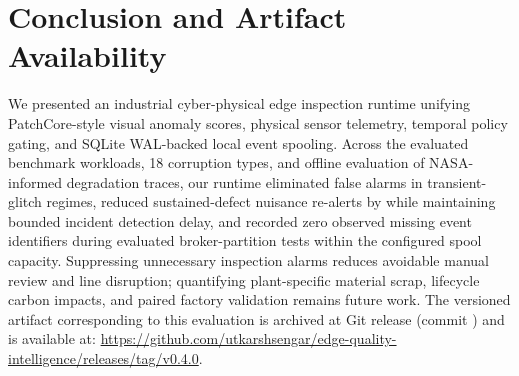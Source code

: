 \documentclass[conference]{IEEEtran}
\begin{document}
\section{Conclusion and Artifact Availability}
We presented an industrial cyber-physical edge inspection runtime unifying PatchCore-style visual anomaly scores, physical sensor telemetry, temporal policy gating, and SQLite WAL-backed local event spooling. Across the evaluated benchmark workloads, 18 corruption types, and offline evaluation of NASA-informed degradation traces, our runtime eliminated false alarms in transient-glitch regimes, reduced sustained-defect nuisance re-alerts by \SustainedSuppressionFull{} while maintaining bounded incident detection delay, and recorded zero observed missing event identifiers during evaluated broker-partition tests within the configured spool capacity. Suppressing unnecessary inspection alarms reduces avoidable manual review and line disruption; quantifying plant-specific material scrap, lifecycle carbon impacts, and paired factory validation remains future work. The versioned artifact corresponding to this evaluation is archived at Git release \texttt{\ArtifactReleaseTag{}} (commit \texttt{\GitCommitHash{}}) and is available at: \url{https://github.com/utkarshsengar/edge-quality-intelligence/releases/tag/v0.4.0}.



\end{document}
